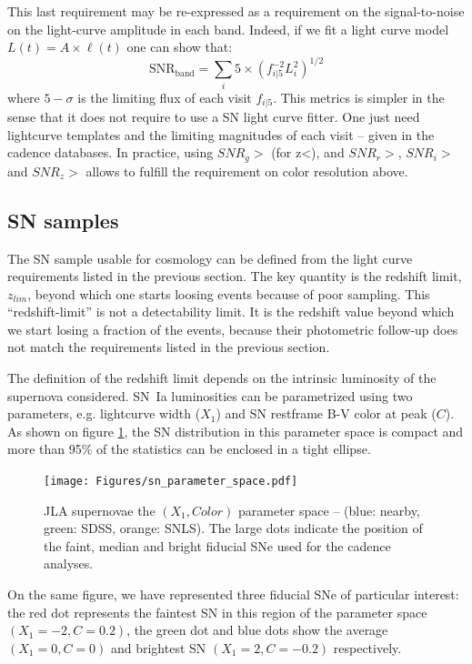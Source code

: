 \documentclass [11pt,a4paper]{article}
\begin{document}
This last requirement may be re-expressed as a requirement on the
signal-to-noise on the light-curve amplitude in each band. Indeed, if
we fit a light curve model $L(t) = A \times \ell(t)$ one can show
that:
$$
\mathrm{SNR_{band}} = \sum_{i} 5 \times (f^{-2}_{i|5} L_i^2)^{1/2}
$$
where $5-\sigma$ is the limiting flux of each visit $f_{i|5}$.
This metrics is simpler in the sense that it does not require to use a
SN light curve fitter. One just need lightcurve templates and the
limiting magnitudes of each visit -- given in the cadence
databases. In practice, using $SNR_g > $ (for z<), and $SNR_r > $,
$SNR_i > $ and $SNR_z > $ allows to fulfill the requirement on color
resolution above.


\subsection{SN samples}

The SN sample usable for cosmology can be defined from the light curve
requirements listed in the previous section. The key quantity is the
redshift limit, $z_{lim}$, beyond which one starts loosing events
because of poor sampling.  This ``redshift-limit'' is not a
detectability limit.  It is the redshift value beyond which we start
losing a fraction of the events, because their photometric follow-up
does not match the requirements listed in the previous section.

The definition of the redshift limit depends on the intrinsic
luminosity of the supernova considered.  SN~Ia luminosities can be
parametrized using two parameters, e.g. lightcurve width ($X_1$) and
SN restframe B-V color at peak ($C$).  As shown on figure
\ref{fig:jla_X1_C}, the SN distribution in this parameter space is
compact and more than 95\% of the statistics can be enclosed in a
tight ellipse. 

\begin{figure}
  \begin{center}
    \texttt{[image: Figures/sn\_parameter\_space.pdf]}
    \caption{JLA supernovae the $(X_1,Color)$ parameter space --
      (blue: nearby, green: SDSS, orange: SNLS).  The large dots
      indicate the position of the faint, median and bright fiducial
      SNe used for the cadence analyses.}
    \label{fig:jla_X1_C}
  \end{center}
\end{figure}

On the same figure, we have represented three fiducial SNe of
particular interest: the red dot represents the faintest SN in this
region of the parameter space $(X_1=-2, C=0.2)$, the green dot and
blue dots show the average $(X_1=0, C=0)$ and brightest SN $(X_1=2,
C=-0.2)$ respectively.
\end{document}
